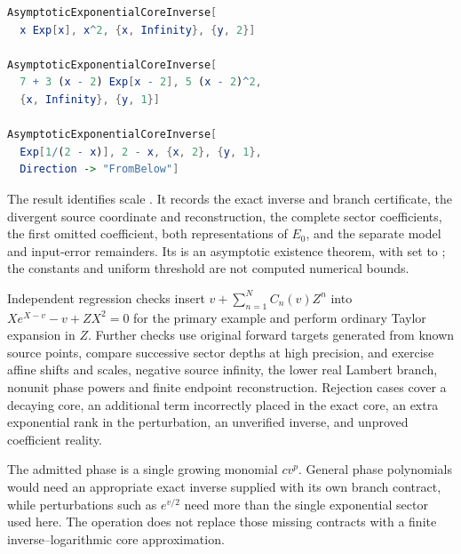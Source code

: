 \begin{lstlisting}[language=Mathematica]
AsymptoticExponentialCoreInverse[
  x Exp[x], x^2, {x, Infinity}, {y, 2}]

AsymptoticExponentialCoreInverse[
  7 + 3 (x - 2) Exp[x - 2], 5 (x - 2)^2,
  {x, Infinity}, {y, 1}]

AsymptoticExponentialCoreInverse[
  Exp[1/(2 - x)], 2 - x, {x, 2}, {y, 1},
  Direction -> "FromBelow"]
\end{lstlisting}

The result identifies scale .
It records the exact inverse and branch certificate, the divergent source
coordinate and reconstruction, the complete sector coefficients, the first
omitted coefficient, both representations of $E_0$, and the separate model
and input-error remainders. Its  is an asymptotic
existence theorem, with  set to ; the
constants and uniform threshold are not computed numerical bounds.

Independent regression checks insert
$v+\sum_{n=1}^N C_n(v)Z^n$ into
$X e^{X-v}-v+ZX^2=0$ for the primary example and perform ordinary Taylor
expansion in $Z$. Further checks use original forward targets generated
from known source points, compare successive sector depths at high
precision, and exercise affine shifts and scales, negative source infinity,
the lower real Lambert branch, nonunit phase powers and finite endpoint
reconstruction. Rejection cases cover a decaying core, an additional term
incorrectly placed in the exact core, an extra exponential rank in the
perturbation, an unverified inverse, and unproved coefficient reality.

The admitted phase is a single growing monomial $cv^p$. General phase
polynomials would need an appropriate exact inverse supplied with its own
branch contract, while perturbations such as $e^{v/2}$ need more than the
single exponential sector used here. The operation does not replace those
missing contracts with a finite inverse--logarithmic core approximation.
